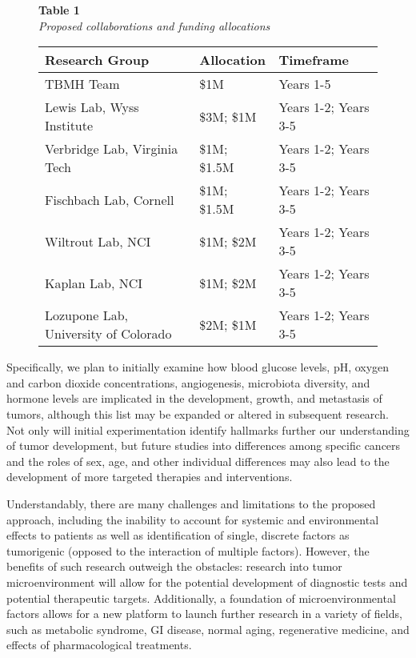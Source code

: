\documentclass[11pt,letterpaper,final] {article}
\begin{document}
\begin{figure}[htp]
\begin{spacing}{1}
{\bfseries Table 1}\\
{\itshape Proposed collaborations and funding allocations} \\
\begin{tabular*}{\textwidth}{l|ll}
\hline
\bfseries{Research Group} & \bfseries{Allocation} & \bfseries{Timeframe} \\
\hline
TBMH Team & \$1M & Years 1-5\\
Lewis Lab, Wyss Institute & \$3M; \$1M & Years 1-2; Years 3-5\\
Verbridge Lab, Virginia Tech & \$1M; \$1.5M & Years 1-2; Years 3-5\\
Fischbach Lab, Cornell & \$1M; \$1.5M & Years 1-2; Years 3-5\\
Wiltrout Lab, NCI & \$1M; \$2M & Years 1-2; Years 3-5\\
Kaplan Lab, NCI & \$1M; \$2M & Years 1-2; Years 3-5\\
Lozupone Lab, University of Colorado & \$2M; \$1M & Years 1-2; Years 3-5\\
\hline
\end{tabular*}
\end{spacing}
\label{table1}
\end{figure}

\linespread{2}
Specifically, we plan to initially examine how blood glucose levels, pH, oxygen and carbon dioxide concentrations, angiogenesis, microbiota diversity, and hormone levels are implicated in the development, growth, and metastasis of tumors, although this list may be expanded or altered in subsequent research. Not only will initial experimentation identify hallmarks further our understanding of tumor development, but future studies into differences among specific cancers and the roles of sex, age, and other individual differences may also lead to the development of more targeted therapies and interventions.

Understandably, there are many challenges and limitations to the proposed approach, including the inability to account for systemic and environmental effects to patients as well as identification of single, discrete factors as tumorigenic (opposed to the interaction of multiple factors). However, the benefits of such research outweigh the obstacles: research into tumor microenvironment will allow for the potential development of diagnostic tests and potential therapeutic targets. Additionally, a foundation of microenvironmental factors allows for a new platform to launch further research in a variety of fields, such as metabolic syndrome, GI disease, normal aging, regenerative medicine, and effects of pharmacological treatments.
\end{document}
